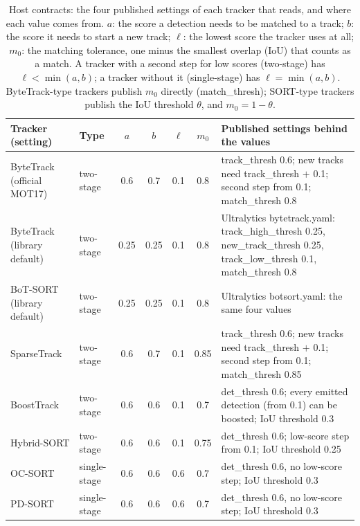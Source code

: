 \begin{table}[!t]
\caption{Host contracts: the four published settings of each tracker that \scl{} reads, and where
each value comes from. $a$: the score a detection needs to be matched to a track; $b$: the score it
needs to start a new track; $\ell$: the lowest score the tracker uses at all; $m_0$: the matching
tolerance, one minus the smallest overlap (IoU) that counts as a match. A tracker with a second
step for low scores (two-stage) has $\ell<\min(a,b)$; a tracker without it (single-stage) has
$\ell=\min(a,b)$. ByteTrack-type trackers publish $m_0$ directly (match\_thresh); SORT-type
trackers publish the IoU threshold $\theta$, and $m_0=1-\theta$.}
\label{tab:contracts}
\centering\footnotesize
\setlength{\tabcolsep}{4pt}
\begin{tabular}{@{}>{\raggedright\arraybackslash}p{30mm}lcccc>{\raggedright\arraybackslash}p{78mm}@{}}
\toprule
Tracker (setting) & Type & $a$ & $b$ & $\ell$ & $m_0$ & Published settings behind the values\\
\midrule
ByteTrack (official MOT17) & two-stage & 0.6 & 0.7 & 0.1 & 0.8 & track\_thresh 0.6; new tracks need track\_thresh $+$ 0.1; second step from 0.1; match\_thresh 0.8\\
ByteTrack (library default) & two-stage & 0.25 & 0.25 & 0.1 & 0.8 & Ultralytics bytetrack.yaml: track\_high\_thresh 0.25, new\_track\_thresh 0.25, track\_low\_thresh 0.1, match\_thresh 0.8\\
BoT-SORT (library default) & two-stage & 0.25 & 0.25 & 0.1 & 0.8 & Ultralytics botsort.yaml: the same four values\\
SparseTrack & two-stage & 0.6 & 0.7 & 0.1 & 0.85 & track\_thresh 0.6; new tracks need track\_thresh $+$ 0.1; second step from 0.1; match\_thresh 0.85\\
BoostTrack & two-stage & 0.6 & 0.6 & 0.1 & 0.7 & det\_thresh 0.6; every emitted detection (from 0.1) can be boosted; IoU threshold 0.3\\
Hybrid-SORT & two-stage & 0.6 & 0.6 & 0.1 & 0.75 & det\_thresh 0.6; low-score step from 0.1; IoU threshold 0.25\\
OC-SORT & single-stage & 0.6 & 0.6 & 0.6 & 0.7 & det\_thresh 0.6, no low-score step; IoU threshold 0.3\\
PD-SORT & single-stage & 0.6 & 0.6 & 0.6 & 0.7 & det\_thresh 0.6, no low-score step; IoU threshold 0.3\\
\bottomrule
\end{tabular}
\end{table}
